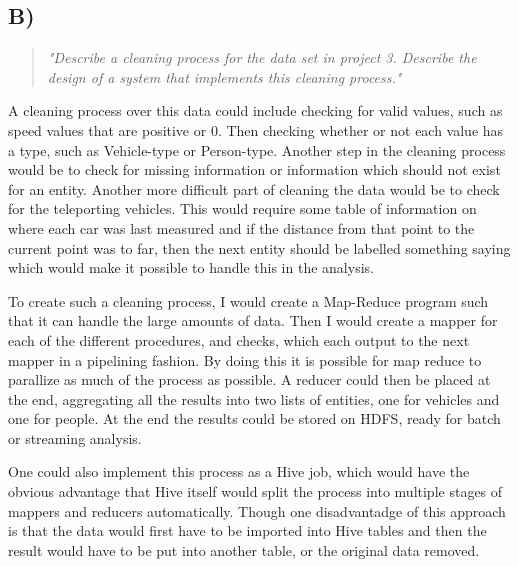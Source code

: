 \subsection{B)}
\begin{quote}
	\textit{"Describe	a	cleaning	process	for	the	data	set	in	project	3.	Describe	the	design	of	a	system	that	implements	this	cleaning	process."}
\end{quote}
A cleaning process over this data could include checking for valid values, such as speed values that are positive or 0. Then checking whether or not each value has a type, such as Vehicle-type or Person-type. Another step in the cleaning process would be to check for missing information or information which should not exist for an entity. Another more difficult part of cleaning the data would be to check for the teleporting vehicles. This would require some table of information on where each car was last measured and if the distance from that point to the current point was to far, then the next entity should be labelled something saying which would make it possible to handle this in the analysis.

To create such a cleaning process, I would create a Map-Reduce program such that it can handle the large amounts of data. Then I would create a mapper for each of the different procedures, and checks, which each output to the next mapper in a pipelining fashion. By doing this it is possible for map reduce to parallize as much of the process as possible. A reducer could then be placed at the end, aggregating all the results into two lists of entities, one for vehicles and one for people. At the end the results could be stored on HDFS, ready for batch or streaming analysis.

One could also implement this process as a Hive job, which would have the obvious advantage that Hive itself would split the process into multiple stages of mappers and reducers automatically. Though one disadvantadge of this approach is that the data would first have to be imported into Hive tables and then the result would have to be put into another table, or the original data removed.